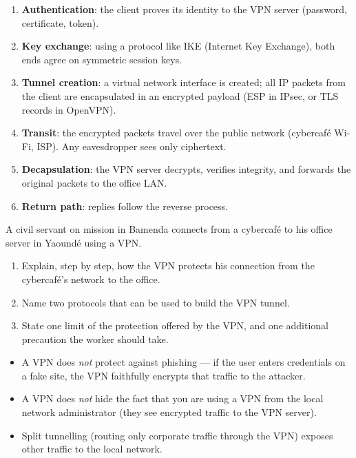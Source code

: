 \documentclass[11pt]{article}
\begin{document}
\begin{methode}
\begin{enumerate}
\item \textbf{Authentication}: the client proves its identity to the VPN server (password, certificate, token).
\item \textbf{Key exchange}: using a protocol like IKE (Internet Key Exchange), both ends agree on symmetric session keys.
\item \textbf{Tunnel creation}: a virtual network interface is created; all IP packets from the client are encapsulated in an encrypted payload (ESP in IPsec, or TLS records in OpenVPN).
\item \textbf{Transit}: the encrypted packets travel over the public network (cybercafé Wi-Fi, ISP). Any eavesdropper sees only ciphertext.
\item \textbf{Decapsulation}: the VPN server decrypts, verifies integrity, and forwards the original packets to the office LAN.
\item \textbf{Return path}: replies follow the reverse process.
\end{enumerate}
\end{methode}

\begin{exercice}
A civil servant on mission in Bamenda connects from a cybercafé to his office server in Yaoundé using a VPN.
\begin{enumerate}
\item Explain, step by step, how the VPN protects his connection from the cybercafé's network to the office.
\item Name two protocols that can be used to build the VPN tunnel.
\item State one limit of the protection offered by the VPN, and one additional precaution the worker should take.
\end{enumerate}
\end{exercice}

\begin{attention}
\begin{itemize}
\item A VPN does \emph{not} protect against phishing — if the user enters credentials on a fake site, the VPN faithfully encrypts that traffic to the attacker.
\item A VPN does \emph{not} hide the fact that you are using a VPN from the local network administrator (they see encrypted traffic to the VPN server).
\item Split tunnelling (routing only corporate traffic through the VPN) exposes other traffic to the local network.
\end{itemize}
\end{attention}
\end{document}
